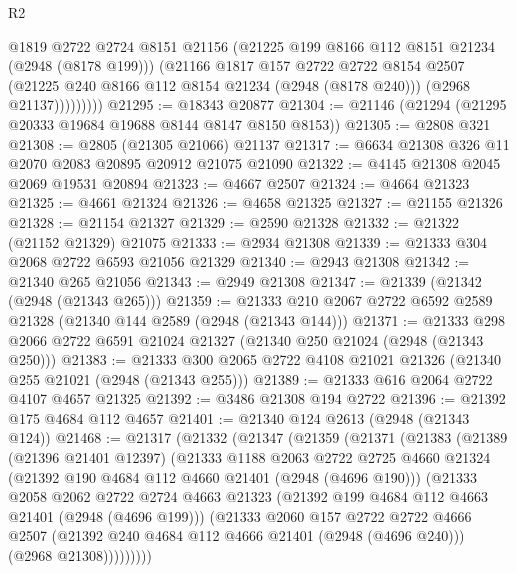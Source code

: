 \begin{lexlean}{R2}
\begin{coremodule}
                  @1819
                  @2722
                  @2724
                  @8151
                  @21156
                  (@21225 @199 @8166 @112 @8151 @21234 (@2948 (@8178 @199)))
                  (@21166
                    @1817
                    @157
                    @2722
                    @2722
                    @8154
                    @2507
                    (@21225 @240 @8166 @112 @8154 @21234 (@2948 (@8178 @240)))
                    (@2968 @21137)))))))))
@21295 := @18343 @20877
@21304 := @21146 (@21294 (@21295 @20333 @19684 @19688 @8144 @8147 @8150 @8153))
@21305 := @2808 @321
@21308 := @2805 (@21305 @21066) @21137
@21317 := @6634 @21308 @326 @11 @2070 @2083 @20895 @20912 @21075 @21090
@21322 := @4145 @21308 @2045 @2069 @19531 @20894
@21323 := @4667 @2507
@21324 := @4664 @21323
@21325 := @4661 @21324
@21326 := @4658 @21325
@21327 := @21155 @21326
@21328 := @21154 @21327
@21329 := @2590 @21328
@21332 := @21322 (@21152 @21329) @21075
@21333 := @2934 @21308
@21339 := @21333 @304 @2068 @2722 @6593 @21056 @21329
@21340 := @2943 @21308
@21342 := @21340 @265 @21056
@21343 := @2949 @21308
@21347 := @21339 (@21342 (@2948 (@21343 @265)))
@21359 := @21333 @210 @2067 @2722 @6592 @2589 @21328 (@21340 @144 @2589 (@2948 (@21343 @144)))
@21371 := @21333 @298 @2066 @2722 @6591 @21024 @21327 (@21340 @250 @21024 (@2948 (@21343 @250)))
@21383 := @21333 @300 @2065 @2722 @4108 @21021 @21326 (@21340 @255 @21021 (@2948 (@21343 @255)))
@21389 := @21333 @616 @2064 @2722 @4107 @4657 @21325
@21392 := @3486 @21308 @194 @2722
@21396 := @21392 @175 @4684 @112 @4657
@21401 := @21340 @124 @2613 (@2948 (@21343 @124))
@21468 := @21317
    (@21332
      (@21347
        (@21359
          (@21371
            (@21383
              (@21389
                (@21396 @21401 @12397)
                (@21333
                  @1188
                  @2063
                  @2722
                  @2725
                  @4660
                  @21324
                  (@21392 @190 @4684 @112 @4660 @21401 (@2948 (@4696 @190)))
                  (@21333
                    @2058
                    @2062
                    @2722
                    @2724
                    @4663
                    @21323
                    (@21392 @199 @4684 @112 @4663 @21401 (@2948 (@4696 @199)))
                    (@21333
                      @2060
                      @157
                      @2722
                      @2722
                      @4666
                      @2507
                      (@21392 @240 @4684 @112 @4666 @21401 (@2948 (@4696 @240)))
                      (@2968 @21308)))))))))

\end{coremodule}
\end{lexlean}

